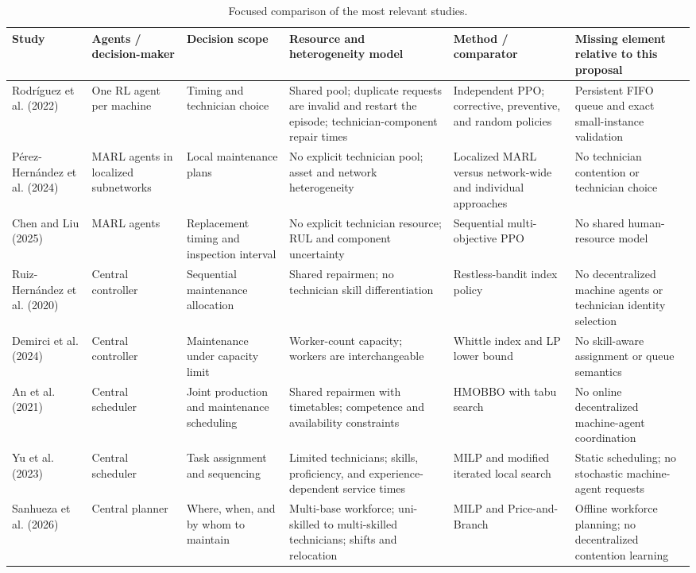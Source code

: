 \documentclass[11pt]{article}
\begin{document}
\begin{table}[ht]
\centering
\scriptsize
\caption{Focused comparison of the most relevant studies.}
\label{tab:related-work}
\begin{tabularx}{\textwidth}{p{2.7cm}p{1.6cm}p{2.15cm}p{3.0cm}p{2.35cm}Y}
\toprule
Study & Agents / decision-maker & Decision scope & Resource and heterogeneity model & Method / comparator & Missing element relative to this proposal \\
\midrule
Rodríguez et al. (2022) & One RL agent per machine & Timing and technician choice & Shared pool; duplicate requests are invalid and restart the episode; technician-component repair times & Independent PPO; corrective, preventive, and random policies & Persistent FIFO queue and exact small-instance validation \\
Pérez-Hernández et al. (2024) & MARL agents in localized subnetworks & Local maintenance plans & No explicit technician pool; asset and network heterogeneity & Localized MARL versus network-wide and individual approaches & No technician contention or technician choice \\
Chen and Liu (2025) & MARL agents & Replacement timing and inspection interval & No explicit technician resource; RUL and component uncertainty & Sequential multi-objective PPO & No shared human-resource model \\
Ruiz-Hernández et al. (2020) & Central controller & Sequential maintenance allocation & Shared repairmen; no technician skill differentiation & Restless-bandit index policy & No decentralized machine agents or technician identity selection \\
Demirci et al. (2024) & Central controller & Maintenance under capacity limit & Worker-count capacity; workers are interchangeable & Whittle index and LP lower bound & No skill-aware assignment or queue semantics \\
An et al. (2021) & Central scheduler & Joint production and maintenance scheduling & Shared repairmen with timetables; competence and availability constraints & HMOBBO with tabu search & No online decentralized machine-agent coordination \\
Yu et al. (2023) & Central scheduler & Task assignment and sequencing & Limited technicians; skills, proficiency, and experience-dependent service times & MILP and modified iterated local search & Static scheduling; no stochastic machine-agent requests \\
Sanhueza et al. (2026) & Central planner & Where, when, and by whom to maintain & Multi-base workforce; uni-skilled to multi-skilled technicians; shifts and relocation & MILP and Price-and-Branch & Offline workforce planning; no decentralized contention learning \\

\end{tabularx}
\end{table}
\end{document}
